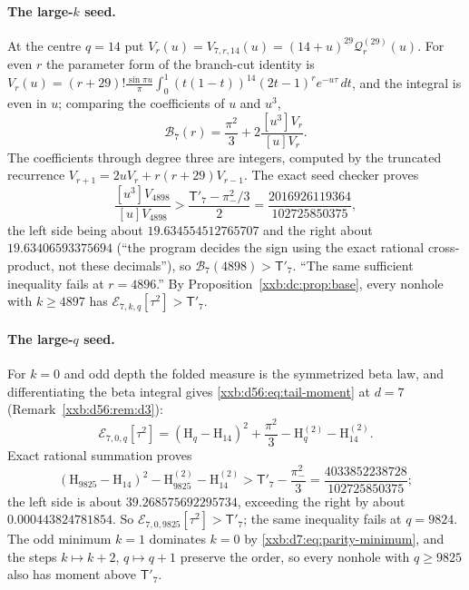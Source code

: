 \documentclass[11pt,a4paper]{article}
\numberwithin{equation}{section}
\theoremstyle{definition}
\theoremstyle{remark}
\theoremstyle{plain}
\newcommand{\fall}[2]{#1^{\underline{#2}}}
\begin{document}
\paragraph{The large-$k$ seed.}  At the centre $q=14$ put
$V_r(u)=V_{7,r,14}(u)=\fall{(14+u)}{29}\mathcal Q_r^{(29)}(u)$.  For even $r$
the parameter form of the branch-cut identity is
$V_r(u)=(r+29)!\frac{\sin\pi u}{\pi}\int_0^1(t(1-t))^{14}(2t-1)^re^{-u\tau}\,dt$,
and the integral is even in $u$; comparing the coefficients of $u$ and $u^3$,
\begin{equation}\label{xxb:d7:eq:center-moment}
 \mathcal B_7(r)=\frac{\pi^2}{3}+2\frac{[u^3]V_r}{[u]V_r}.
\end{equation}
The coefficients through degree three are integers, computed by the
truncated recurrence $V_{r+1}=2uV_r+r(r+29)V_{r-1}$.  The exact seed checker
proves
\begin{equation}\label{xxb:d7:eq:center-ineq}
 \frac{[u^3]V_{4898}}{[u]V_{4898}}>\frac{\mathsf T'_7-\pi_-^2/3}{2}
 =\frac{2016926119364}{102725850375},
\end{equation}
the left side being about $19.634554512765707$ and the right about
$19.63406593375694$ (``the program decides the sign using the exact rational
cross-product, not these decimals''), so $\mathcal B_7(4898)>\mathsf T'_7$.
``The same sufficient inequality fails at $r=4896$.''  By
Proposition~\ref{xxb:dc:prop:base}, every nonhole with $k\ge4897$ has
$\mathcal E_{7,k,q}[\tau^2]>\mathsf T'_7$.

\paragraph{The large-$q$ seed.}  For $k=0$ and odd depth the folded measure is
the symmetrized beta law, and differentiating the beta integral gives
\eqref{xxb:d56:eq:tail-moment} at $d=7$ (Remark~\ref{xxb:d56:rem:d3}):
\begin{equation}\label{xxb:d7:eq:tail-moment}
 \mathcal E_{7,0,q}[\tau^2]=(\mathrm H_q-\mathrm H_{14})^2+\frac{\pi^2}{3}
 -\mathrm H_q^{(2)}-\mathrm H_{14}^{(2)}.
\end{equation}
Exact rational summation proves
\begin{equation}\label{xxb:d7:eq:tail-ineq}
 (\mathrm H_{9825}-\mathrm H_{14})^2-\mathrm H_{9825}^{(2)}-\mathrm H_{14}^{(2)}
 >\mathsf T'_7-\frac{\pi_-^2}{3}=\frac{4033852238728}{102725850375};
\end{equation}
the left side is about $39.268575692295734$, exceeding the right by about
$0.000443824781854$.  So $\mathcal E_{7,0,9825}[\tau^2]>\mathsf T'_7$; the same
inequality fails at $q=9824$.  The odd minimum $k=1$ dominates $k=0$ by
\eqref{xxb:d7:eq:parity-minimum}, and the steps $k\mapsto k+2$, $q\mapsto q+1$
preserve the order, so every nonhole with $q\ge9825$ also has moment above
$\mathsf T'_7$.
\end{document}
